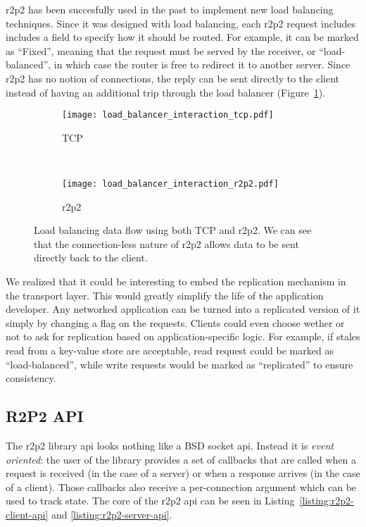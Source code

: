 \Gls{r2p2} has been succesfully used in the past to implement new load balancing techniques\cite{r2p2}.
Since it was designed with load balancing, each \gls{r2p2} request includes includes a field to specify how it should be routed.
For example, it can be marked as ``Fixed'', meaning that the request must be served by the receiver, or ``load-balanced'', in which case the router is free to redirect it to another server.
Since \gls{r2p2} has no notion of connections, the reply can be sent directly to the client instead of having an additional trip through the load balancer (Figure~\ref{fig:load_balancing}).

\begin{figure}
    \centering
    \begin{subfigure}[t]{0.4\textwidth}
        \texttt{[image: load\_balancer\_interaction\_tcp.pdf]}
        \caption{TCP}
    \end{subfigure}%
    ~
    \begin{subfigure}[t]{0.4\textwidth}
        \texttt{[image: load\_balancer\_interaction\_r2p2.pdf]}
        \caption{\gls{r2p2}}
    \end{subfigure}
    \caption{
        Load balancing data flow using both TCP and \gls{r2p2}.
        We can see that the connection-less nature of \gls{r2p2} allows data to be sent directly back to the client.
        \label{fig:load_balancing}
    }
\end{figure}


We realized that it could be interesting to embed the replication mechanism in the transport layer.
This would greatly simplify the life of the application developer.
Any networked application can be turned into a replicated version of it simply by changing a flag on the requests.
Clients could even choose wether or not to ask for replication based on application-specific logic.
For example, if stales read from a key-value store are acceptable, read request could be marked as ``load-balanced'', while write requests would be marked as ``replicated'' to ensure consistency.


\subsection{R2P2 API}

The \gls{r2p2} library \gls{api} looks nothing like a BSD socket \gls{api}.
Instead it is \emph{event oriented}: the user of the library provides a set of callbacks that are called when a request is received (in the case of a server) or when a response arrives (in the case of a client).
Those callbacks also receive a per-connection argument which can be used to track state.
The core of the \gls{r2p2} \gls{api} can be seen in Listing~\ref{listing:r2p2-client-api} and \ref{listing:r2p2-server-api}.

